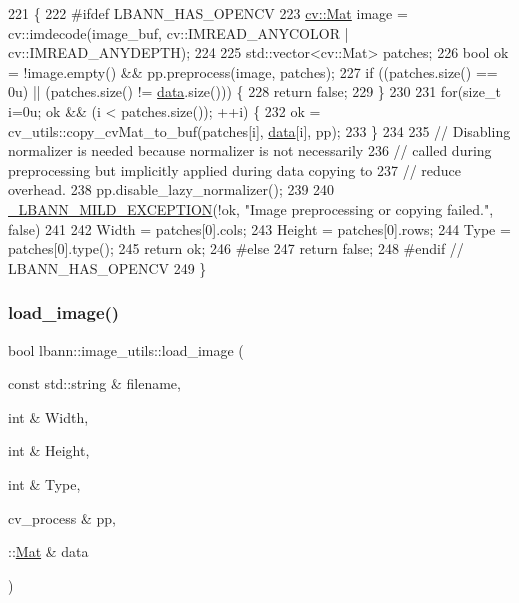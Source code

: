 \begin{DoxyCode}
221                                                                                                            
                 \{
222 \textcolor{preprocessor}{#ifdef LBANN\_HAS\_OPENCV}
223   \hyperlink{base_8hpp_a68f11fdc31b62516cb310831bbe54d73}{cv::Mat} image = cv::imdecode(image\_buf, cv::IMREAD\_ANYCOLOR | cv::IMREAD\_ANYDEPTH);
224 
225   std::vector<cv::Mat> patches;
226   \textcolor{keywordtype}{bool} ok = !image.empty() && pp.preprocess(image, patches);
227   \textcolor{keywordflow}{if} ((patches.size() == 0u) || (patches.size() != \hyperlink{namespacelbann_1_1cnpy__utils_a9ac86d96ccb1f8b4b2ea16441738781f}{data}.size())) \{
228     \textcolor{keywordflow}{return} \textcolor{keyword}{false};
229   \}
230 
231   \textcolor{keywordflow}{for}(\textcolor{keywordtype}{size\_t} i=0u; ok && (i < patches.size()); ++i) \{
232     ok = cv\_utils::copy\_cvMat\_to\_buf(patches[i], \hyperlink{namespacelbann_1_1cnpy__utils_a9ac86d96ccb1f8b4b2ea16441738781f}{data}[i], pp);
233   \}
234 
235   \textcolor{comment}{// Disabling normalizer is needed because normalizer is not necessarily}
236   \textcolor{comment}{// called during preprocessing but implicitly applied during data copying to}
237   \textcolor{comment}{// reduce overhead.}
238   pp.disable\_lazy\_normalizer();
239 
240   \hyperlink{mild__exception_8hpp_a7b8339c566152ab29ce66b63e90c67f9}{\_LBANN\_MILD\_EXCEPTION}(!ok, \textcolor{stringliteral}{"Image preprocessing or copying failed."}, \textcolor{keyword}{false})
241 
242   Width  = patches[0].cols;
243   Height = patches[0].rows;
244   Type   = patches[0].type();
245   return ok;
246 \textcolor{preprocessor}{#else}
247   \textcolor{keywordflow}{return} \textcolor{keyword}{false};
248 \textcolor{preprocessor}{#endif // LBANN\_HAS\_OPENCV}
249 \}
\end{DoxyCode}
\mbox{\label{classlbann_1_1image__utils_a6e55d50736ff8c80c91300488df117a1}} 
\subsubsection{\texorpdfstring{load\+\_\+image()}{load\_image()}\hspace{0.1cm}{\footnotesize\ttfamily [4/5]}}
{\footnotesize\ttfamily bool lbann\+::image\+\_\+utils\+::load\+\_\+image (\begin{DoxyParamCaption}\item[{const std\+::string \&}]{filename,  }\item[{int \&}]{Width,  }\item[{int \&}]{Height,  }\item[{int \&}]{Type,  }\item[{cv\+\_\+process \&}]{pp,  }\item[{\+::\hyperlink{base_8hpp_a68f11fdc31b62516cb310831bbe54d73}{Mat} \&}]{data }\end{DoxyParamCaption})\hspace{0.3cm}{\ttfamily [static]}}



